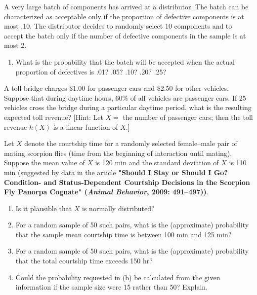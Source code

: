 \documentclass[11pt,letterpaper,boxed]{hmcpset}
\begin{document}
{\begin{problem}[3.4.58a]
	A very large batch of components has arrived at a distributor. The batch can be characterized as acceptable only if the proportion of defective components is at most .10. The distributor decides to randomly select 10 components and to accept the batch only if the number of defective components in the sample is at most 2.
	\begin{enumerate}
		\item
			What is the probability that the batch will be accepted when the actual proportion of defectives is .01? .05? .10? .20? .25?
	\end{enumerate}
\end{problem}

\begin{solution}
	\vfill
\end{solution}
\newpage


\begin{problem}[3.4.60]
	A toll bridge charges \$1.00 for passenger cars and \$2.50 for other vehicles. Suppose that during daytime hours, 60\% of all vehicles are passenger cars. If 25 vehicles cross the bridge during a particular daytime period, what is the resulting expected toll revenue? [Hint: Let $X =$ the number of passenger cars; then the toll revenue $h(X)$ is a linear function of $X$.]
\end{problem}

\begin{solution}
	\vfill
\end{solution}
\newpage


\begin{problem}[5.4.50]
	Let $X$ denote the courtship time for a randomly selected female--male pair of mating scorpion flies (time from the beginning of interaction until mating). Suppose the mean value of $X$ is 120 min and the standard deviation of $X$ is 110 min (suggested by data in the article \textbf{"Should I Stay or Should I Go? Condition- and Status-Dependent Courtship Decisions in the Scorpion Fly Panorpa Cognate" (\emph{Animal Behavior}, 2009: 491--497))}.
	\begin{enumerate}
		\item
			Is it plausible that $X$ is normally distributed?
		\item
			For a random sample of 50 such pairs, what is the (approximate) probability that the sample mean courtship time is between 100 min and 125 min?
		\item
			For a random sample of 50 such pairs, what is the (approximate) probability that the total courtship time exceeds 150 hr?
		\item
			Could the probability requested in (b) be calculated from the given information if the sample size were 15 rather than 50? Explain.
	\end{enumerate}
\end{problem}

}
\end{document}
